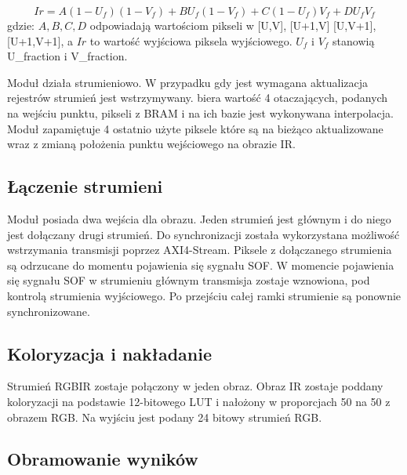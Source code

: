 \begin{equation}\label{equ:bilinear}
Ir = A(1-U_f)(1-V_f)+BU_f(1-V_f)+C(1-U_f)V_f+ D U_fV_f
\end{equation}
\noindent gdzie: $ A, B, C ,D $ odpowiadają wartościom pikseli w [U,V], [U+1,V] [U,V+1], [U+1,V+1], a $ Ir $ to wartość wyjściowa piksela wyjściowego. $U_f$ i $V_f$ stanowią U\_fraction i V\_fraction. %

Moduł działa strumieniowo. 
W przypadku gdy jest wymagana aktualizacja rejestrów strumień jest wstrzymywany.
biera wartość 4 otaczających, podanych na wejściu punktu, pikseli z BRAM i na ich bazie jest wykonywana interpolacja. %
Moduł zapamiętuje 4 ostatnio użyte piksele które są na bieżąco aktualizowane wraz z zmianą położenia punktu wejściowego na obrazie IR.


\subsection{Łączenie strumieni}

Moduł posiada dwa wejścia dla obrazu. 
Jeden strumień jest głównym i do niego jest dołączany drugi strumień. %
Do synchronizacji została wykorzystana możliwość wstrzymania transmisji poprzez AXI4-Stream. 
Piksele z dołączanego strumienia są odrzucane do momentu pojawienia się sygnału SOF.
W momencie pojawienia się sygnału SOF w strumieniu głównym transmisja zostaje wznowiona, pod kontrolą strumienia wyjściowego. %
Po przejściu całej ramki strumienie są ponownie synchronizowane.  

\subsection{Koloryzacja i nakładanie}

Strumień RGBIR zostaje połączony w jeden obraz. 
Obraz IR zostaje poddany koloryzacji na podstawie 12-bitowego LUT i nałożony w proporcjach 50 na 50 z obrazem RGB. 
Na wyjściu jest podany 24 bitowy strumień RGB.


\subsection{Obramowanie wyników}

